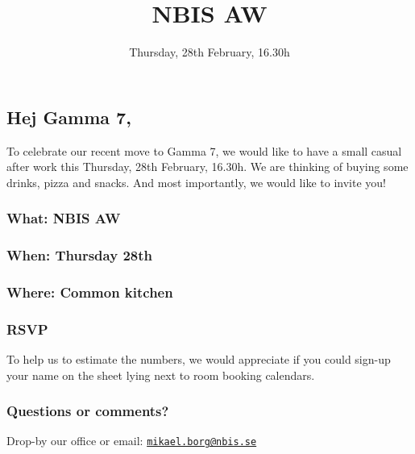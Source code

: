 \documentclass[12pt,a4paper,]{article}
\title{NBIS AW}
\subtitle{Thursday, 28th February, 16.30h}
\author{}
\date{}
\begin{document}
\maketitle

\subsection{Hej Gamma 7,}\label{hej-gamma-7}

To celebrate our recent move to Gamma 7, we would like to have a small
casual after work this Thursday, 28th February, 16.30h. We are thinking
of buying some drinks, pizza and snacks. And most importantly, we would
like to invite you!

\subsubsection{What: NBIS AW}\label{what-nbis-aw}

\subsubsection{When: Thursday 28th}\label{when-thursday-28th}

\subsubsection{Where: Common kitchen}\label{where-common-kitchen}

\subsubsection{RSVP}\label{rsvp}

To help us to estimate the numbers, we would appreciate if you could
sign-up your name on the sheet lying next to room booking calendars.

\subsubsection{Questions or comments?}\label{questions-or-comments}

Drop-by our office or email:
\href{mailto:mikael.borg@nbis.se}{\nolinkurl{mikael.borg@nbis.se}}


\end{document}

